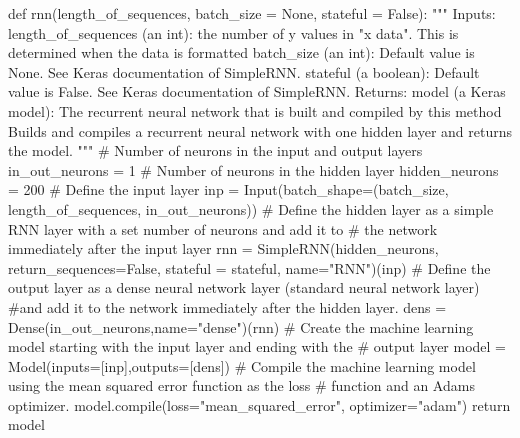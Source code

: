 \documentclass[%
oneside,                 %
final,                   %
10pt]{article}
\begin{document}
def rnn(length_of_sequences, batch_size = None, stateful = False):
    """
        Inputs:
            length_of_sequences (an int): the number of y values in "x data".  This is determined
                when the data is formatted
            batch_size (an int): Default value is None.  See Keras documentation of SimpleRNN.
            stateful (a boolean): Default value is False.  See Keras documentation of SimpleRNN.
        Returns:
            model (a Keras model): The recurrent neural network that is built and compiled by this
                method
        Builds and compiles a recurrent neural network with one hidden layer and returns the model.
    """
    # Number of neurons in the input and output layers
    in_out_neurons = 1
    # Number of neurons in the hidden layer
    hidden_neurons = 200
    # Define the input layer
    inp = Input(batch_shape=(batch_size, 
                length_of_sequences, 
                in_out_neurons))  
    # Define the hidden layer as a simple RNN layer with a set number of neurons and add it to 
    # the network immediately after the input layer
    rnn = SimpleRNN(hidden_neurons, 
                    return_sequences=False,
                    stateful = stateful,
                    name="RNN")(inp)
    # Define the output layer as a dense neural network layer (standard neural network layer)
    #and add it to the network immediately after the hidden layer.
    dens = Dense(in_out_neurons,name="dense")(rnn)
    # Create the machine learning model starting with the input layer and ending with the 
    # output layer
    model = Model(inputs=[inp],outputs=[dens])
    # Compile the machine learning model using the mean squared error function as the loss 
    # function and an Adams optimizer.
    model.compile(loss="mean_squared_error", optimizer="adam")  
    return model


\epycod


\end{document}
